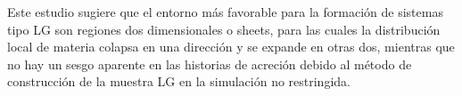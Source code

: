 \begin{abstracts}
Este estudio sugiere que el entorno más favorable para la formación de sistemas tipo 
LG son regiones dos dimensionales o sheets, para las cuales la distribución local de 
materia colapsa en una dirección y se expande en otras dos, mientras que no hay un 
sesgo aparente en las historias de acreción debido al método de construcción de la 
muestra LG en la simulación no restringida.

\end{abstracts}





